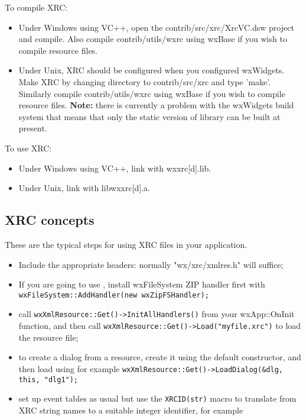 To compile XRC:

\begin{itemize}\itemsep=0pt
\item Under Windows using VC++, open the contrib/src/xrc/XrcVC.dsw project
and compile. Also compile contrib/utils/wxrc using wxBase if you wish to compile
resource files.
\item Under Unix, XRC should be configured when you configured
wxWidgets. Make XRC by changing directory to contrib/src/xrc and
type 'make'.  Similarly compile contrib/utils/wxrc using wxBase if you wish to compile
resource files. {\bf Note:} there is currently a
problem with the wxWidgets build system that means that
only the static version of library can be built at present.
\end{itemize}

To use XRC:

\begin{itemize}\itemsep=0pt
\item Under Windows using VC++, link with wxxrc[d].lib.
\item Under Unix, link with libwxxrc[d].a.
\end{itemize}

\subsection{XRC concepts}\label{xrcconcepts}

These are the typical steps for using XRC files in your application.

\begin{itemize}\itemsep=0pt
\item Include the appropriate headers: normally "wx/xrc/xmlres.h" will suffice;
\item If you are going to use , install
wxFileSystem ZIP handler first with {\tt wxFileSystem::AddHandler(new wxZipFSHandler);}
\item call {\tt wxXmlResource::Get()->InitAllHandlers()} from your wxApp::OnInit function,
and then call {\tt wxXmlResource::Get()->Load("myfile.xrc")} to load the resource file;
\item to create a dialog from a resource, create it using the default constructor, and then
load using for example {\tt wxXmlResource::Get()->LoadDialog(\&dlg, this, "dlg1");}
\item set up event tables as usual but use the {\tt XRCID(str)} macro to translate from XRC string names
to a suitable integer identifier, for example {\tt EVT\_MENU(XRCID("quit"), MyFrame::OnQuit)}.
\end{itemize}

